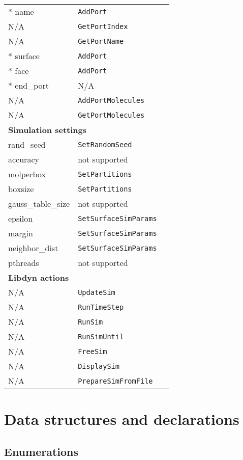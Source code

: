 \documentclass {book}
\newcommand {\ttt} {\texttt}
\begin{document}
\begin{longtable}[c]{lll}
{*} name & \ttt{AddPort}\\
N/A & \ttt{GetPortIndex}\\
N/A & \ttt{GetPortName}\\
{*} surface & \ttt{AddPort}\\
{*} face & \ttt{AddPort}\\
{*} end\_port & N/A\\
N/A & \ttt{AddPortMolecules}\\
N/A & \ttt{GetPortMolecules}\\
\hline
\multicolumn{3}{l}{\hspace{0.3in}\textbf{Simulation settings}}\\
\hline
rand\_seed & \ttt{SetRandomSeed}\\
accuracy & not supported\\
molperbox & \ttt{SetPartitions}\\
boxsize & \ttt{SetPartitions}\\
gauss\_table\_size & not supported\\
epsilon & \ttt{SetSurfaceSimParams}\\
margin & \ttt{SetSurfaceSimParams}\\
neighbor\_dist & \ttt{SetSurfaceSimParams}\\
pthreads & not supported\\
\hline
\multicolumn{3}{l}{\hspace{0.3in}\textbf{Libdyn actions}}\\
\hline
N/A & \ttt{UpdateSim}\\
N/A & \ttt{RunTimeStep}\\
N/A & \ttt{RunSim}\\
N/A & \ttt{RunSimUntil}\\
N/A & \ttt{FreeSim}\\
N/A & \ttt{DisplaySim}\\
N/A & \ttt{PrepareSimFromFile}\\
\end{longtable}


\chapter{Data structures and declarations}

\section{Enumerations}
\end{document}

